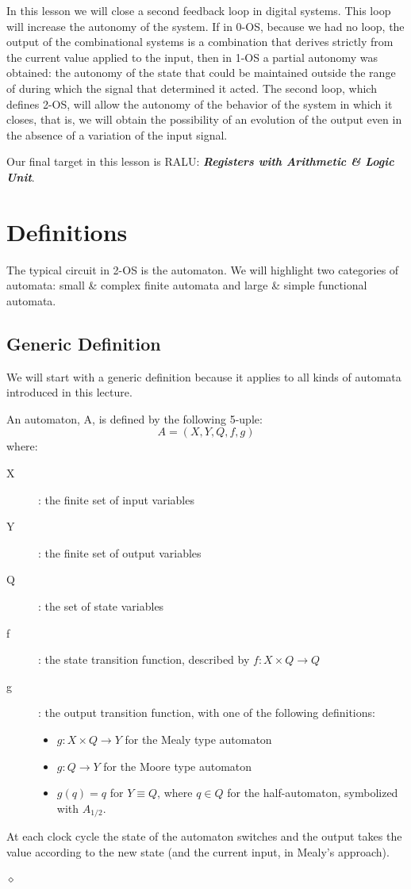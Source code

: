 In this lesson we will close a second feedback loop in digital systems. This loop will increase the autonomy of the system. If in 0-OS, because we had no loop, the output of the combinational systems is a combination that derives strictly from the current value applied to the input, then in 1-OS a partial autonomy was obtained: the autonomy of the state that could be maintained outside the range of during which the signal that determined it acted. The second loop, which defines 2-OS, will allow the autonomy of the behavior of the system in which it closes, that is, we will obtain the possibility of an evolution of the output even in the absence of a variation of the input signal.

Our final target in this lesson is RALU: {\bf {\em Registers with Arithmetic \& Logic Unit}}.

\section{Definitions}

The typical circuit in 2-OS is the automaton. We will highlight two categories of automata: small \& complex finite automata and large \& simple functional automata.

\subsection{Generic Definition}

We will start with a generic definition because it applies to all kinds of automata introduced in this lecture.

\begin{definition}
An automaton, A, is defined by the following 5-uple:
$$A=(X, Y, Q, f, g)$$
where:
\begin{description}
\item[X]: the finite set of input variables \item[Y]: the finite
set of output variables \item[Q]: the set of state variables
\item[f]: the state transition function, described by $f:X \times
Q \rightarrow Q$ \item[g]: the output transition function,  with
one of the  following  definitions:
\begin{itemize}
    \item $g:X \times Q \rightarrow Y$ for the Mealy type automaton
    \item $g:Q \rightarrow Y$ for the Moore type automaton
    \item $g(q)=q$ for $Y \equiv Q$, where $q \in Q$ for the half-automaton, symbolized with $A_{1/2}$.
\end{itemize}
\end{description}
At each clock cycle the state of the automaton  switches and the
output takes the value according to the new state (and the current
input, in Mealy's approach).

$\diamond$
\end{definition}

